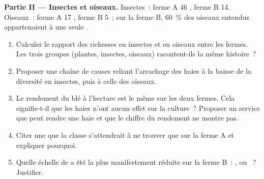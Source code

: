 \begin{problem}
\medskip
\noindent\textbf{Partie II --- Insectes et oiseaux.}
Insectes~: ferme A 46 , ferme B 14. Oiseaux~: ferme A 17
, ferme B 5~; sur la ferme B, 60~\% des oiseaux entendus
appartenaient à une seule .
\begin{enumerate}[resume]
  \item Calculer le rapport des richesses en insectes et en oiseaux
        entre les fermes. Les trois groupes (plantes, insectes,
        oiseaux) racontent-ils la même histoire~?
  \item Proposer une chaîne de causes reliant l'arrachage des haies à
        la baisse de la diversité en insectes, puis à celle des
        oiseaux.
  \item Le rendement du blé à l'hectare est le même sur les deux
        fermes. Cela signifie-t-il que les haies n'ont aucun effet sur
        la culture~? Proposer un service que peut rendre une haie et
        que le chiffre du rendement ne montre pas.
  \item Citer une  que la classe s'attendrait à ne trouver que
        sur la ferme A et expliquer pourquoi.
  \item Quelle échelle de  a été la plus manifestement
        réduite sur la ferme B~: ,  ou ~?
        Justifier.
\end{enumerate}


\end{problem}
